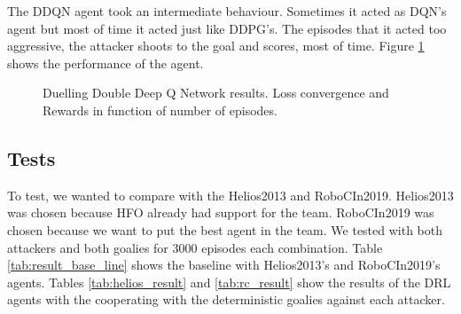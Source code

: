 The DDQN agent took an intermediate behaviour. Sometimes it acted as DQN's agent but most of time it acted just like DDPG's. The episodes that it acted too aggressive, the attacker shoots to the goal and scores, most of time. Figure \ref{fig:ddqnres} shows the performance of the agent.

\begin{figure}[H]
    \centering
    \qquad
    \qquad
        \caption{Duelling Double Deep Q Network results. Loss convergence and Rewards in function of number of episodes.}
    \label{fig:ddqnres}
\end{figure}




\subsection{Tests}
To test, we wanted to compare with the Helios2013 and RoboCIn2019. Helios2013 was chosen because HFO already had support for the team. RoboCIn2019 was chosen because we want to put the best agent in the team. We tested with both attackers and both goalies for 3000 episodes each combination. Table \ref{tab:result_base_line} shows the baseline with Helios2013's and RoboCIn2019's agents. Tables \ref{tab:helios_result} and \ref{tab:rc_result} show the results of the DRL agents with the cooperating with the deterministic goalies against each attacker.

